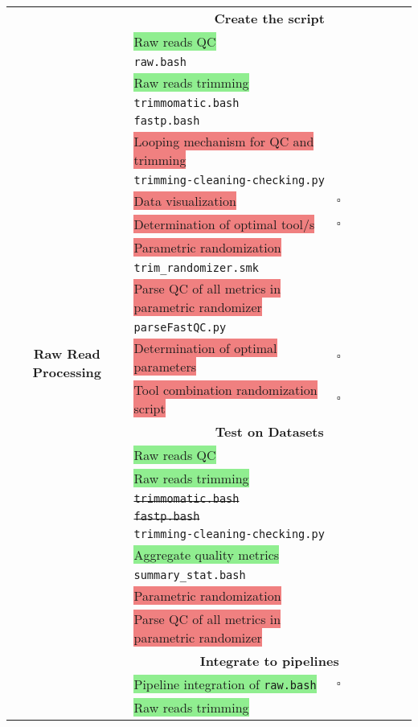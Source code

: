 \documentclass[11pt]{report}
\newcommand{\done}{\checkmark}
\newcommand{\pending}{$\square$}
\newcommand{\highlightessential}[1]{\colorbox{lightgreen}{#1}}
\newcommand{\highlightrobust}[1]{\colorbox{lightcoral}{#1}}
\newcommand{\deprecated}[1]{\sout{#1}}
\begin{document}
\begin{longtable}{|c|p{8cm}|c|c|c|c|c|c|}
	\multirow{29}{*}{\textbf{Raw Read Processing}}
	& \multicolumn{7}{c|}{\textbf{Create the script}} \\
	& \highlightessential{Raw reads QC} & & & & & & \done \\ 
	& \multicolumn{7}{l}{\texttt{raw.bash}} \\ 
	& \highlightessential{Raw reads trimming} & & & & & & \done \\ 
	& \multicolumn{7}{l}{\texttt{trimmomatic.bash}} \\ 
	& \multicolumn{7}{l}{\texttt{fastp.bash}} \\
	& \highlightrobust{Looping mechanism for QC and trimming} & & & & & & \done \\
	& \multicolumn{7}{l}{\texttt{trimming-cleaning-checking.py}} \\ 
	& \highlightrobust{Data visualization} & \pending & & & & & \\
	& \highlightrobust{Determination of optimal tool/s} & \pending & & & & & \\
	& \highlightrobust{Parametric randomization} & & & & & & \done \\
	& \multicolumn{7}{l}{\texttt{trim\_randomizer.smk}} \\
	& \highlightrobust{Parse QC of all metrics in parametric randomizer} & & & & & & \done \\
	& \multicolumn{7}{l}{\texttt{parseFastQC.py}} \\
	& \highlightrobust{Determination of optimal parameters} & \pending & & & & & \\
	& \highlightrobust{Tool combination randomization script} & \pending & & & & & \\
	& \multicolumn{7}{c|}{\textbf{Test on Datasets}} \\
	& \highlightessential{Raw reads QC} & & & & & & \done \\ 
	& \highlightessential{Raw reads trimming} & & & & & & \done \\ 
	& \multicolumn{7}{l}{\texttt{\deprecated{trimmomatic.bash}}} \\ 
	& \multicolumn{7}{l}{\texttt{\deprecated{fastp.bash}}} \\
	& \multicolumn{7}{l}{\texttt{trimming-cleaning-checking.py}} \\ 
	& \highlightessential{Aggregate quality metrics} & & & & & & \done \\
	& \multicolumn{7}{l}{\texttt{summary\_stat.bash}} \\ 
	& \highlightrobust{Parametric randomization} & & & & & & \done \\
	& \highlightrobust{Parse QC of all metrics in parametric randomizer} & & & & & & \done \\
	& \multicolumn{7}{c|}{\textbf{Integrate to pipelines}} \\
	& \highlightessential{Pipeline integration of \texttt{raw.bash}} & \pending & & & & & \\
	& \highlightessential{Raw reads trimming} & & & & & & \done \\ \hline
	

\end{longtable}
\end{document}
